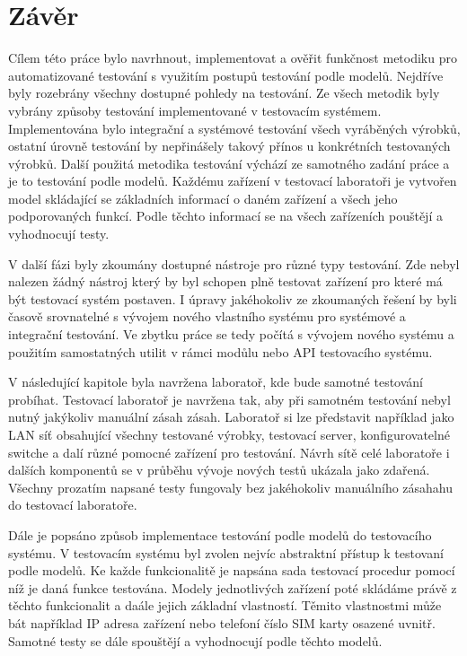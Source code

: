 \chapter{Závěr}
Cílem této práce bylo navrhnout, implementovat a ověřit funkčnost metodiku pro automatizované testování s využitím postupů testování podle modelů. Nejdříve byly rozebrány všechny dostupné pohledy na testování. Ze všech metodik byly vybrány způsoby testování implementované v testovacím systémem. Implementována bylo integrační a systémové testování všech vyráběných výrobků, ostatní úrovně testování by nepřinášely takový přínos u konkrétních testovaných výrobků. Další použitá metodika testování výchází ze samotného zadání práce a je to testování podle modelů. Každému zařízení v testovací laboratoři je vytvořen model skládající se základních informací o daném zařízení a všech jeho podporovaných funkcí. Podle těchto informací se na všech zařízeních pouštějí a vyhodnocují testy.

V další fázi byly zkoumány dostupné nástroje pro různé typy testování. Zde nebyl nalezen žádný nástroj který by byl schopen plně testovat zařízení pro které má být testovací systém postaven. I úpravy jakéhokoliv ze zkoumaných řešení by byli časově srovnatelné s vývojem nového vlastního systému pro systémové a integrační testování. Ve zbytku práce se tedy počítá s vývojem nového systému a použitím samostatných utilit v rámci modůlu nebo API testovacího systému.

V následující kapitole byla navržena laboratoř, kde bude samotné testování probíhat. Testovací laboratoř je navržena tak, aby při samotném testování nebyl nutný jakýkoliv manuální zásah zásah. Laboratoř si lze představit například jako LAN síť obsahující všechny testované výrobky, testovací server, konfigurovatelné switche a dalí různé pomocné zařízení pro testování. Návrh sítě celé laboratoře i dalších komponentů se v průběhu vývoje nových testů ukázala jako zdařená. Všechny prozatím napsané testy fungovaly bez jakéhokoliv manuálního zásahahu do testovací laboratoře.

Dále je popsáno způsob implementace testování podle modelů do testovacího systému. V testovacím systému byl zvolen nejvíc abstraktní přístup k testovaní podle modelů. Ke každe funkcionalitě je napsána sada testovací procedur pomocí níž je daná funkce testována. Modely jednotlivých zařízení poté skládáme právě z těchto funkcionalit a daále jejich základní vlastností. Těmito vlastnostmi může bát například IP adresa zařízení nebo telefoní číslo SIM karty osazené uvnitř. Samotné testy se dále spouštějí a vyhodnocují podle těchto modelů.

